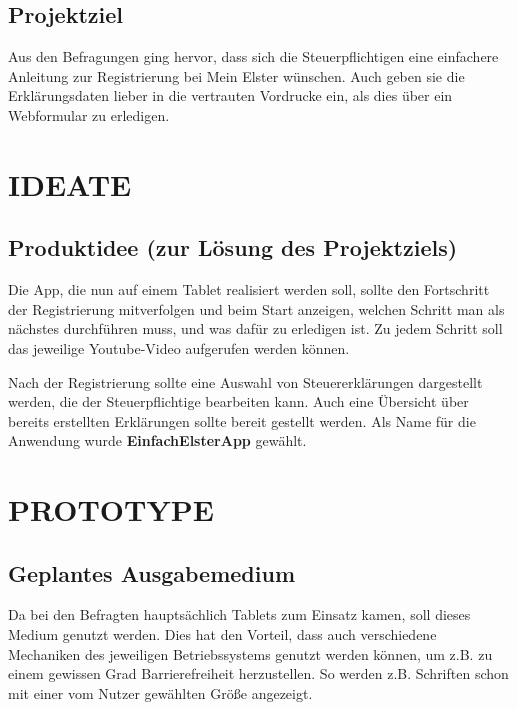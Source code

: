 \subsection{Projektziel}\label{Projektziel}

Aus den Befragungen ging hervor, dass sich die Steuerpflichtigen eine einfachere Anleitung zur Registrierung bei \grq{}Mein Elster\grq{} wünschen. Auch geben sie die Erklärungsdaten lieber in die vertrauten Vordrucke ein, als dies über ein Webformular zu erledigen.



\section{IDEATE}\label{IDEATE}


\subsection{Produktidee (zur Lösung des Projektziels)}\label{Produktidee (zur Lösung des Projektziels) }
Die App, die nun auf einem Tablet realisiert werden soll, sollte den Fortschritt der Registrierung mitverfolgen und beim Start anzeigen, welchen Schritt man als nächstes durchführen muss, und was dafür zu erledigen ist. Zu jedem Schritt soll das jeweilige Youtube-Video aufgerufen werden können.

Nach der Registrierung sollte eine Auswahl von Steuererklärungen dargestellt werden, die der Steuerpflichtige bearbeiten kann. Auch eine Übersicht über bereits erstellten Erklärungen sollte bereit gestellt werden. Als Name für die Anwendung wurde \grqq{}\textbf{EinfachElsterApp}\grqq{} gewählt.


\section{PROTOTYPE}\label{PROTOTYPE}

\subsection{Geplantes Ausgabemedium}\label{Geplantes Ausgabemedium}
Da bei den Befragten hauptsächlich Tablets zum Einsatz kamen, soll dieses Medium genutzt werden. Dies hat den Vorteil, dass auch verschiedene Mechaniken des jeweiligen Betriebssystems genutzt werden können, um z.B. zu einem gewissen Grad Barrierefreiheit herzustellen. So werden z.B. Schriften schon mit einer vom Nutzer gewählten Größe angezeigt.

